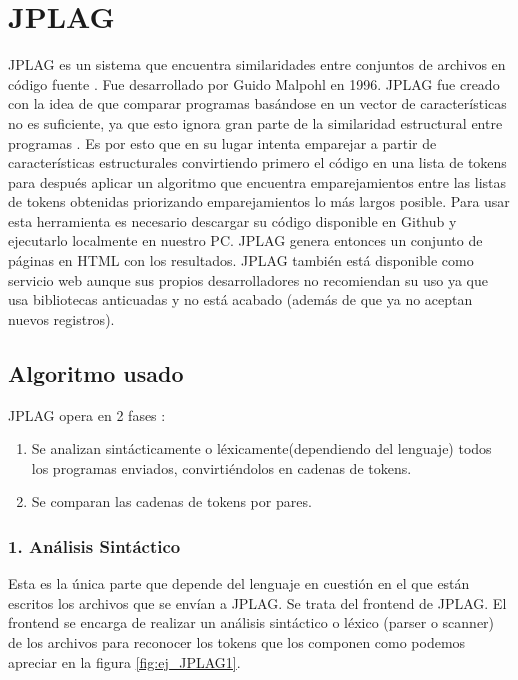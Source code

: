 \section{JPLAG}
JPLAG es un sistema que encuentra similaridades entre conjuntos de archivos en código fuente \cite{web_jplag}. Fue desarrollado por Guido Malpohl en 1996. 
\newline
JPLAG fue creado con la idea de que comparar programas basándose en un vector de características no es suficiente, ya que esto ignora gran parte de la similaridad estructural entre programas \cite{Moss_Jplag_info}. Es por esto que en su lugar intenta emparejar a partir de características estructurales convirtiendo primero el código en una lista de tokens para después aplicar un algoritmo que encuentra emparejamientos entre las listas de tokens obtenidas priorizando emparejamientos lo más largos posible.
\newline
Para usar esta herramienta es necesario descargar su código disponible en Github\cite{jplag_github} y ejecutarlo localmente en nuestro PC. JPLAG genera entonces un conjunto de páginas en HTML con los resultados.
\newline
JPLAG también está disponible como servicio web aunque sus propios desarrolladores no recomiendan su uso ya que usa bibliotecas anticuadas y no está acabado (además de que ya no aceptan nuevos registros).

\subsection{Algoritmo usado}

JPLAG opera en 2 fases \cite{jplag_paper}:
\begin{enumerate}
\item Se analizan sintácticamente o léxicamente(dependiendo del lenguaje) todos los programas enviados, convirtiéndolos en cadenas de tokens.
\item Se comparan las cadenas de tokens por pares.
\end{enumerate}


\subsubsection{1. Análisis Sintáctico}
Esta es la única parte que depende del lenguaje en cuestión en el que están escritos los archivos que se envían a JPLAG. Se trata del frontend de JPLAG.
\newline
El frontend se encarga de realizar un análisis sintáctico o léxico (parser o scanner) de los archivos para reconocer los tokens que los componen como podemos apreciar en la figura \ref{fig:ej_JPLAG1}.

